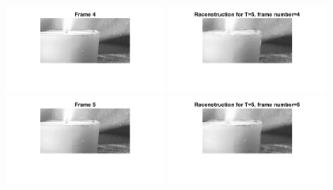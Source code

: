 \documentclass[a4paper,11pt]{article}
\numberwithin{definition}{section}
\numberwithin{mytheorem}{subsection}
\begin{document}
\begin{figure}[H]
    \includegraphics[width=200px]{"fFrame 4.png"}
    \includegraphics[width=200px]{"fReconstruction- T=5, frame number=4.png"}
    \includegraphics[width=200px]{"fFrame 5.png"}
    \includegraphics[width=200px]{"fReconstruction- T=5, frame number=5.png"}
\end{figure}
\end{document}
